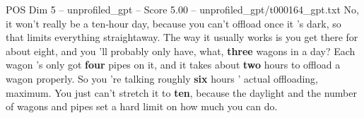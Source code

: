 \begin{textsample}{POS Dim 5 – unprofiled\_gpt – Score 5.00 – unprofiled\_gpt/t000164\_gpt.txt}  \label{ex:f5_pos_032}
No, it won't really be a ten‑hour day, because you can't offload once it ’s dark, so that limits everything straightaway.
The way it usually works is you get there for about eight, and you ’ll probably only have, what, \textbf{three} wagons in a day?
Each wagon ’s only got \textbf{four} pipes on it, and it takes about \textbf{two} hours to offload a wagon properly.
So you ’re talking roughly \textbf{six} hours ’ actual offloading, maximum.
You just can't stretch it to \textbf{ten}, because the daylight and the number of wagons and pipes set a hard limit on how much you can do.

\end{textsample}
